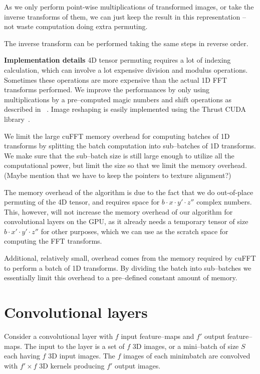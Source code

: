 \documentclass[conference]{IEEEtran}
\begin{document}
  As we only perform point-wise multiplications of transformed images,
  or take the inverse transforms of them, we can just keep the result
  in this representation -- not waste computation doing extra
  permuting.

  The inverse transform can be performed taking the same steps in
  reverse order.

  {\bf Implementation details} 4D tensor permuting requires a lot of
  indexing calculation, which can involve a lot expensive division and
  modulus operations.  Sometimes these operations are more expensive
  than the actual 1D FFT transforms performed.  We improve the
  performances by only using multiplications by a pre--computed magic
  numbers and shift operations as described in
  ~\cite{warren2013hacker}.  Image reshaping is easily implemented
  using the Thrust CUDA library~\cite{bell2011thrust}.

  We limit the large cuFFT memory overhead for computing batches of 1D
  transforms by splitting the batch computation into sub--batches of
  1D transforms.  We make sure that the sub--batch size is still large
  enough to utilize all the computational power, but limit the size so
  that we limit the memory overhead.  (Maybe mention that we have to
  keep the pointers to texture alignment?)

  The memory overhead of the algorithm is due to the fact that we do
  out-of-place permuting of the 4D tensor, and requires space for $b
  \cdot x \cdot y' \cdot z''$ complex numbers.  This, however, will
  not increase the memory overhead of our algorithm for convolutional
  layers on the GPU, as it already needs a temporary tensor of size $b
  \cdot x' \cdot y' \cdot z''$ for other purposes, which we can use as
  the scratch space for computing the FFT transforms.

  Additional, relatively small, overhead comes from the memory
  required by cuFFT to perform a batch of 1D transforms.  By dividing
  the batch into sub--batches we essentially limit this overhead to a
  pre--defined constant amount of memory.

\section{Convolutional layers}

  Consider a convolutional layer with $f$ input feature--maps and $f'$
  output feature--maps.  The input to the layer is a set of $f$ 3D
  images, or a mini--batch of size $S$ each having $f$ 3D input
  images.  The $f$ images of each minimbatch are convolved with $f'
  \times f$ 3D kernels producing $f'$ output images.
\end{document}
